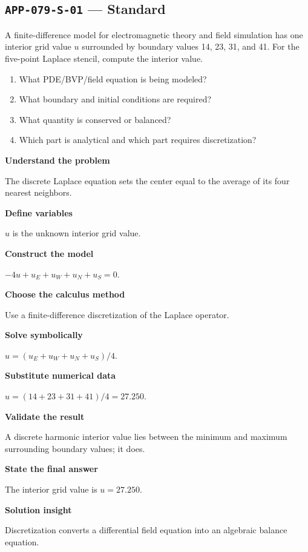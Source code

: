 \documentclass[11pt]{book}
\newcommand{\pid}[1]{\texttt{#1}}
\begin{document}
\subsection*{\pid{APP-079-S-01} — Standard}
\begin{problembox}
A finite-difference model for electromagnetic theory and field simulation has one interior grid value $u$ surrounded by boundary values 14, 23, 31, and 41. For the five-point Laplace stencil, compute the interior value.
\end{problembox}
\begin{promptbox}\begin{enumerate}
\item What PDE/BVP/field equation is being modeled?
\item What boundary and initial conditions are required?
\item What quantity is conserved or balanced?
\item Which part is analytical and which part requires discretization?
\end{enumerate}\end{promptbox}
\begin{solutionbox}
\textbf{Understand the problem}\par The discrete Laplace equation sets the center equal to the average of its four nearest neighbors.\par\medskip
\textbf{Define variables}\par $u$ is the unknown interior grid value.\par\medskip
\textbf{Construct the model}\par $-4u+u_E+u_W+u_N+u_S=0$.\par\medskip
\textbf{Choose the calculus method}\par Use a finite-difference discretization of the Laplace operator.\par\medskip
\textbf{Solve symbolically}\par $u=(u_E+u_W+u_N+u_S)/4$.\par\medskip
\textbf{Substitute numerical data}\par $u=(14+23+31+41)/4=27.250$.\par\medskip
\textbf{Validate the result}\par A discrete harmonic interior value lies between the minimum and maximum surrounding boundary values; it does.\par\medskip
\textbf{State the final answer}\par The interior grid value is $u=27.250$.\par\medskip
\textbf{Solution insight}\par Discretization converts a differential field equation into an algebraic balance equation.\par\medskip
\end{solutionbox}
\end{document}
